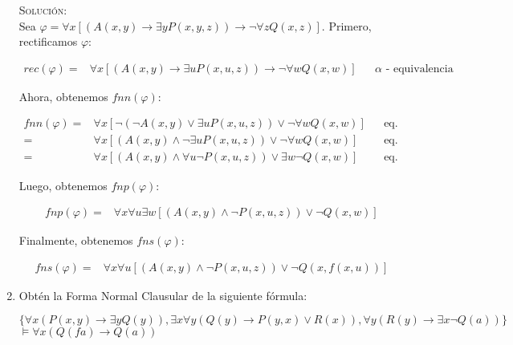 \documentclass[letterpaper,11pt]{article}
\begin{document}
\begin{enumerate}
        \textsc{Solución:} \\
        Sea $\varphi = \forall x[(A(x,y) \rightarrow \exists y P(x,y,z)) 
        \rightarrow \neg \forall z Q(x,z)]$. Primero, rectificamos $\varphi$:
        
        \begin{align*}
            rec(\varphi)
            =& \forall x[(A(x,y) \rightarrow \exists u P(x,u,z)) 
            \rightarrow \neg \forall w Q(x,w)]
            && \text{$\alpha$ - equivalencia}
        \end{align*}
        
        Ahora, obtenemos $fnn(\varphi)$:
        
        \begin{align*}
            fnn(\varphi) 
            =& \forall x[\neg (\neg A(x,y) \lor \exists u P(x,u,z)) \lor \neg 
            \forall w Q(x,w)]
            && \text{eq. lógica} \\
            =& \forall x[(A(x,y) \land \neg \exists u P(x,u,z)) \lor \neg 
            \forall w Q(x,w)] 
            && \text{eq. lógica} \\
            =& \forall x[(A(x,y) \land \forall u \neg P(x,u,z)) \lor 
            \exists w \neg Q(x,w)]
            && \text{eq. lógica} 
        \end{align*}
        
        Luego, obtenemos $fnp(\varphi)$:
        
        \begin{align*}
            fnp(\varphi)
            =& \forall x \forall u \exists w[(A(x,y) \land \neg P(x,u,z)) \lor 
            \neg Q(x,w)] 
        \end{align*}
        
        Finalmente, obtenemos $fns(\varphi)$:
        
        \begin{align*}
            fns(\varphi) 
            =& \forall x \forall u[(A(x,y) \land \neg P(x,u,z)) \lor 
            \neg Q(x,f(x,u))] 
        \end{align*}

        \item Obtén la Forma Normal Clausular de la siguiente fórmula:
        
        \begin{center}
            $\{ \forall x (P(x,y) \rightarrow \exists y Q(y)), \exists x 
            \forall y (Q(y) \rightarrow P(y,x) \lor R(x)), \forall y(R(y) 
            \rightarrow \exists x \neg Q(a))\}$ \\
            $\models \forall x (Q(fa) \rightarrow Q(a))$
        \end{center}
        

\end{enumerate}
\end{document}
